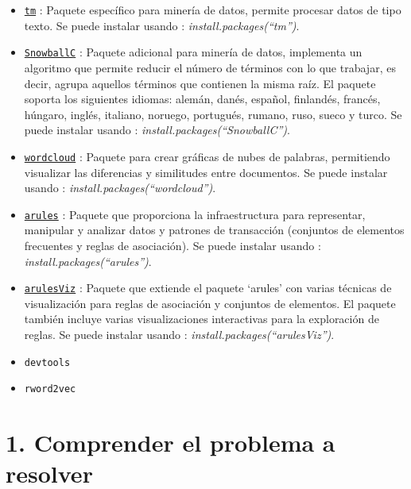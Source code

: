 \documentclass[spanish,]{article}
\begin{document}
\begin{itemize}
\item
  \href{https://cran.r-project.org/web/packages/tm/tm.pdf}{\texttt{tm}}
  : Paquete específico para minería de datos, permite procesar datos de
  tipo texto. Se puede instalar usando :
  \emph{install.packages(``tm'')}.
\item
  \href{https://cran.r-project.org/web/packages/SnowballC/SnowballC.pdf}{\texttt{SnowballC}}
  : Paquete adicional para minería de datos, implementa un algoritmo que
  permite reducir el número de términos con lo que trabajar, es decir,
  agrupa aquellos términos que contienen la misma raíz. El paquete
  soporta los siguientes idiomas: alemán, danés, español, finlandés,
  francés, húngaro, inglés, italiano, noruego, portugués, rumano, ruso,
  sueco y turco. Se puede instalar usando :
  \emph{install.packages(``SnowballC'')}.
\item
  \href{https://cran.r-project.org/web/packages/wordcloud/wordcloud.pdf}{\texttt{wordcloud}}
  : Paquete para crear gráficas de nubes de palabras, permitiendo
  visualizar las diferencias y similitudes entre documentos. Se puede
  instalar usando : \emph{install.packages(``wordcloud'')}.
\item
  \href{https://cran.r-project.org/web/packages/arules/arules.pdf}{\texttt{arules}}
  : Paquete que proporciona la infraestructura para representar,
  manipular y analizar datos y patrones de transacción (conjuntos de
  elementos frecuentes y reglas de asociación). Se puede instalar usando
  : \emph{install.packages(``arules'')}.
\item
  \href{https://cran.r-project.org/web/packages/arulesViz/arulesViz.pdf}{\texttt{arulesViz}}
  : Paquete que extiende el paquete `arules' con varias técnicas de
  visualización para reglas de asociación y conjuntos de elementos. El
  paquete también incluye varias visualizaciones interactivas para la
  exploración de reglas. Se puede instalar usando :
  \emph{install.packages(``arulesViz'')}.
\item
  \texttt{devtools}
\item
  \texttt{rword2vec}
\end{itemize}

\newpage

\section{1. Comprender el problema a
resolver}\label{comprender-el-problema-a-resolver}
\end{document}
